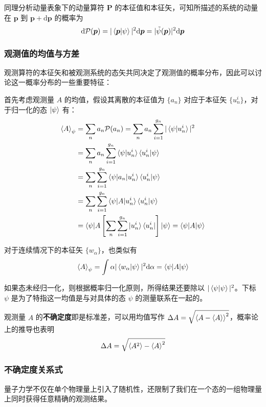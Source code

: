 \documentclass[cn,10pt,math=newtx,citestyle=gb7714-2015,bibstyle=gb7714-2015]{elegantbook}
\def\bm{\boldsymbol}
\def\d{\mathrm d}
\def\td{\tilde}
\def\P{\mathcal P}
\begin{document}
同理分析动量表象下的动量算符 $\bm P$ 的本征值和本征矢，可知所描述的系统的动量在 $\bm p$ 到 $\bm p+\d\bm p$ 的概率为
\begin{equation}
    \d\P(\bm p)=|\braket{\bm p|\psi}|^2\d\bm p=|\td\psi(\bm p)|^2\d\bm p
\end{equation}

\subsubsection{观测值的均值与方差}
观测算符的本征矢和被观测系统的态矢共同决定了观测值的概率分布，因此可以讨论这一概率分布的一些重要特征：

首先考虑观测量 $A$ 的均值，假设其离散的本征值为 $\{a_n\}$ 对应于本征矢 $\{u_n^i\}$，对于归一化的态 $\ket{\psi}$ 有：
\begin{align*}
    \Braket{A}_\psi &= \sum_n a_n\P(a_n)=\sum_n a_n\sum_{i=1}^{g_n}|\braket{\psi|u_n^i}|^2\\
    &=\sum_n a_n\sum_{i=1}^{g_n}\braket{\psi|u_n^i}\braket{u_n^i|\psi}\\
    &=\sum_n \sum_{i=1}^{g_n}\braket{\psi|a_n|u_n^i}\braket{u_n^i|\psi}\\
    &=\sum_n \sum_{i=1}^{g_n}\braket{\psi|A|u_n^i}\braket{u_n^i|\psi}\\
    &=\braket{\psi|A\left[\sum_n\sum_{i=1}^{g_n}\ket{u_n^i}\bra{u_n^i}\right]|\psi}=\braket{\psi|A|\psi}
\end{align*}

对于连续情况下的本征矢 $\{w_\alpha\}$，也类似有
\begin{equation}
    \Braket{A}_\psi = \int\alpha|\braket{w_\alpha|\psi}|^2\d\alpha=\braket{\psi|A|\psi}
\end{equation}

如果态未经归一化，则根据概率归一化原则，所得结果还要除以 $|\braket{\psi|\psi}|^2$。下标 $\psi$ 是为了特指这一均值是与对具体的态 $\psi$ 的测量联系在一起的。

观测量 $A$ 的\textbf{不确定度}即是标准差，可以用均值写作 $\Delta A=\sqrt{\Braket{A-\Braket{A}}^2}$，概率论上的推导也表明
\begin{equation}
    \Delta A = \sqrt{\Braket{A^2}-\Braket{A}^2}
\end{equation}

\subsubsection{不确定度关系式}
量子力学不仅在单个物理量上引入了随机性，还限制了我们在一个态的一组物理量上同时获得任意精确的观测结果。
\end{document}

